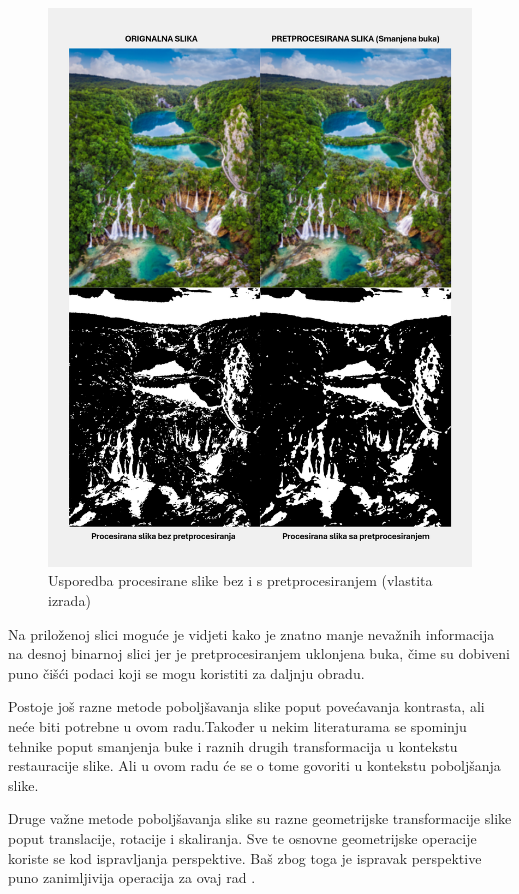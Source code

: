 \documentclass{foi}
\begin{document}
\begin{figure}[H] 
    \centering 
    \includegraphics[width=0.85\linewidth]{slike/withAndWithoutPreProcessing.png} 
    \caption{Usporedba procesirane slike bez i s pretprocesiranjem (vlastita izrada)} 
\end{figure}

Na priloženoj slici moguće je vidjeti kako je znatno manje nevažnih informacija na desnoj binarnoj slici jer je pretprocesiranjem uklonjena buka, čime su dobiveni puno čišći podaci koji se mogu koristiti za daljnju obradu.

Postoje još razne metode poboljšavanja slike poput povećavanja kontrasta, ali neće biti potrebne u ovom radu.Također u nekim literaturama se spominju tehnike poput smanjenja buke  i raznih drugih transformacija u kontekstu restauracije slike. Ali u ovom radu će se o tome govoriti u kontekstu poboljšanja slike.

Druge važne metode poboljšavanja slike su razne geometrijske transformacije slike poput translacije, rotacije i skaliranja. Sve te osnovne geometrijske operacije koriste se kod ispravljanja perspektive. Baš zbog toga je ispravak perspektive puno zanimljivija operacija za ovaj rad \cite{GeometryTransforms}.
\end{document}
